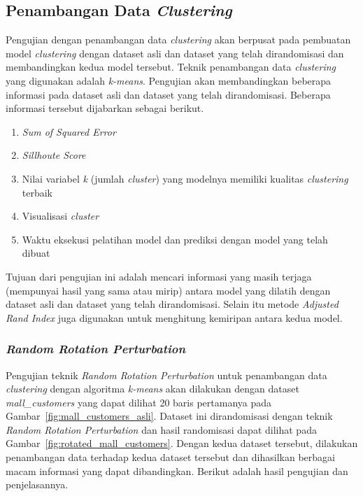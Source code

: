 \subsection{Penambangan Data \textit{Clustering}}
\label{subsec:pengujian-clustering}

Pengujian dengan penambangan data \textit{clustering} akan berpusat pada pembuatan model \textit{clustering} dengan dataset asli dan dataset yang telah dirandomisasi dan membandingkan kedua model tersebut. Teknik penambangan data \textit{clustering} yang digunakan adalah \textit{k-means}. Pengujian akan membandingkan beberapa informasi pada dataset asli dan dataset yang telah dirandomisasi. Beberapa informasi tersebut dijabarkan sebagai berikut.
\begin{enumerate}
	\item \textit{Sum of Squared Error}
	\item \textit{Sillhoute Score}
	\item Nilai variabel \textit{k} (jumlah \textit{cluster}) yang modelnya memiliki kualitas \textit{clustering} terbaik
	\item Visualisasi \textit{cluster}
	\item Waktu eksekusi pelatihan model dan prediksi dengan model yang telah dibuat
\end{enumerate}
Tujuan dari pengujian ini adalah mencari informasi yang masih terjaga (mempunyai hasil yang sama atau mirip) antara model yang dilatih dengan dataset asli dan dataset yang telah dirandomisasi. Selain itu metode \textit{Adjusted Rand Index} juga digunakan untuk menghitung kemiripan antara kedua model.

\subsubsection{\textit{Random Rotation Perturbation}}
\label{subsubsec:pengujian-clustering-rrp}

Pengujian teknik \textit{Random Rotation Perturbation} untuk penambangan data \textit{clustering} dengan algoritma \textit{k-means} akan dilakukan dengan dataset \textit{mall\_customers} yang dapat dilihat 20 baris pertamanya pada Gambar~\ref{fig:mall_customers_asli}. Dataset ini dirandomisasi dengan teknik \textit{Random Rotation Perturbation} dan hasil randomisasi dapat dilihat pada Gambar~\ref{fig:rotated_mall_customers}. Dengan kedua dataset tersebut, dilakukan penambangan data terhadap kedua dataset tersebut dan dihasilkan berbagai macam informasi yang dapat dibandingkan. Berikut adalah hasil pengujian dan penjelasannya.

